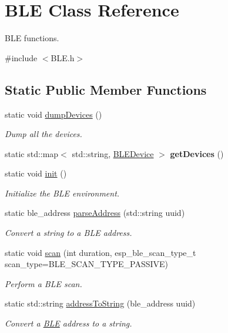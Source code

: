 \hypertarget{class_b_l_e}{}\section{B\+LE Class Reference}
\label{class_b_l_e}


B\+LE functions.  




{\ttfamily \#include $<$B\+L\+E.\+h$>$}

\subsection*{Static Public Member Functions}
\begin{DoxyCompactItemize}
\item 
static void \hyperlink{class_b_l_e_a290242a7fc53e5d5b6e5efe1490a409d}{dump\+Devices} ()
\begin{DoxyCompactList}\small\item\em Dump all the devices. \end{DoxyCompactList}\item 
static std\+::map$<$ std\+::string, \hyperlink{class_b_l_e_device}{B\+L\+E\+Device} $>$ {\bfseries get\+Devices} ()\hypertarget{class_b_l_e_af38e443a0a0f02646790dc24f8abe33a}{}\label{class_b_l_e_af38e443a0a0f02646790dc24f8abe33a}

\item 
static void \hyperlink{class_b_l_e_a9bfb7769eafc1762d65216cf3eff4dc6}{init} ()\hypertarget{class_b_l_e_a9bfb7769eafc1762d65216cf3eff4dc6}{}\label{class_b_l_e_a9bfb7769eafc1762d65216cf3eff4dc6}

\begin{DoxyCompactList}\small\item\em Initialize the B\+LE environment. \end{DoxyCompactList}\item 
static ble\+\_\+address \hyperlink{class_b_l_e_ae41ee3d9d71a3a4b6f3f593b12d4361a}{parse\+Address} (std\+::string uuid)
\begin{DoxyCompactList}\small\item\em Convert a string to a B\+LE address. \end{DoxyCompactList}\item 
static void \hyperlink{class_b_l_e_ac46071b967319e0ff3890455390380eb}{scan} (int duration, esp\+\_\+ble\+\_\+scan\+\_\+type\+\_\+t scan\+\_\+type=B\+L\+E\+\_\+\+S\+C\+A\+N\+\_\+\+T\+Y\+P\+E\+\_\+\+P\+A\+S\+S\+I\+VE)
\begin{DoxyCompactList}\small\item\em Perform a B\+LE scan. \end{DoxyCompactList}\item 
static std\+::string \hyperlink{class_b_l_e_a017c46505644cc5207cad187ca42fca7}{address\+To\+String} (ble\+\_\+address uuid)
\begin{DoxyCompactList}\small\item\em Convert a \hyperlink{class_b_l_e}{B\+LE} address to a string. \end{DoxyCompactList}\end{DoxyCompactItemize}


